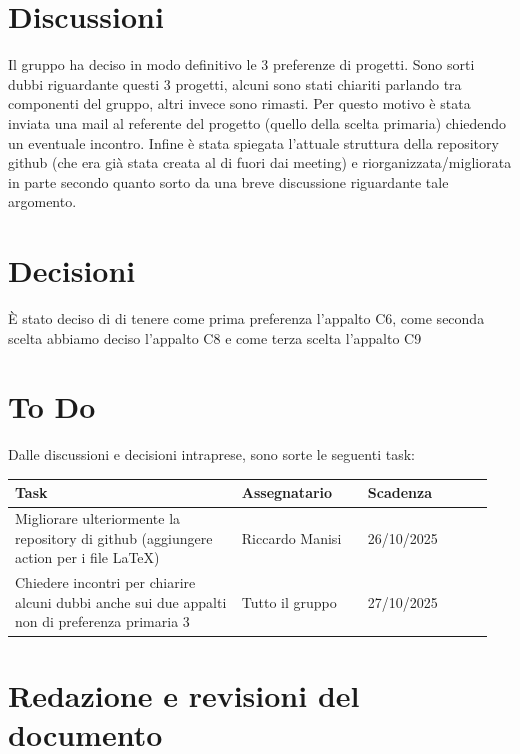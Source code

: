 \documentclass[a4paper,12pt]{article}
\begin{document}
\section{Discussioni}
Il gruppo ha deciso in modo definitivo le 3 preferenze di progetti. Sono sorti dubbi riguardante questi 3 progetti, alcuni sono stati chiariti parlando tra componenti del gruppo, altri invece sono rimasti. Per questo motivo è stata inviata una mail al referente del progetto (quello della scelta primaria) chiedendo un eventuale incontro. Infine è stata spiegata l'attuale struttura della repository github (che era già stata creata al di fuori dai meeting) e riorganizzata/migliorata in parte secondo quanto sorto da una breve discussione riguardante tale argomento.

\section{Decisioni}
È stato deciso di di tenere come prima preferenza l'appalto C6, come seconda scelta abbiamo deciso l'appalto C8 e come terza scelta l'appalto C9

\section{To Do}
Dalle discussioni e decisioni intraprese, sono sorte le seguenti task:

\begin{center}
\small
\renewcommand{\arraystretch}{1.2} 
\begin{tabular}{|p{0.45\linewidth}|p{0.25\linewidth}|p{0.25\linewidth}|}
\hline
\rowcolor{gray!60} 
\textbf{Task} & \textbf{Assegnatario} & \textbf{Scadenza} \\
\hline
\rowcolor{white}
Migliorare ulteriormente la repository di github (aggiungere action per i file LaTeX) & Riccardo Manisi & 26/10/2025 \\
\hline
\rowcolor{white}
Chiedere incontri per chiarire alcuni dubbi anche sui due appalti non di preferenza primaria 3 & Tutto il gruppo & 27/10/2025 \\
\hline
\end{tabular}
\end{center}

\clearpage
\section{Redazione e revisioni del documento}
\end{document}
